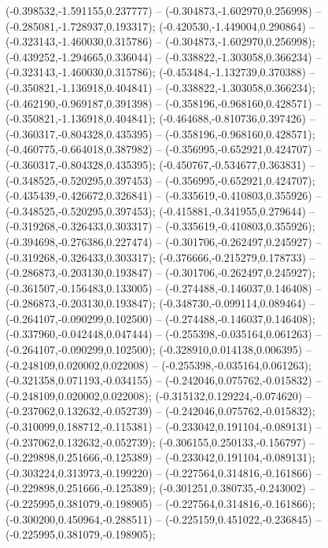 (-0.398532,-1.591155,0.237777) -- (-0.304873,-1.602970,0.256998) -- (-0.285081,-1.728937,0.193317);
 (-0.420530,-1.449004,0.290864) -- (-0.323143,-1.460030,0.315786) -- (-0.304873,-1.602970,0.256998);
 (-0.439252,-1.294665,0.336044) -- (-0.338822,-1.303058,0.366234) -- (-0.323143,-1.460030,0.315786);
 (-0.453484,-1.132739,0.370388) -- (-0.350821,-1.136918,0.404841) -- (-0.338822,-1.303058,0.366234);
 (-0.462190,-0.969187,0.391398) -- (-0.358196,-0.968160,0.428571) -- (-0.350821,-1.136918,0.404841);
 (-0.464688,-0.810736,0.397426) -- (-0.360317,-0.804328,0.435395) -- (-0.358196,-0.968160,0.428571);
 (-0.460775,-0.664018,0.387982) -- (-0.356995,-0.652921,0.424707) -- (-0.360317,-0.804328,0.435395);
 (-0.450767,-0.534677,0.363831) -- (-0.348525,-0.520295,0.397453) -- (-0.356995,-0.652921,0.424707);
 (-0.435439,-0.426672,0.326841) -- (-0.335619,-0.410803,0.355926) -- (-0.348525,-0.520295,0.397453);
 (-0.415881,-0.341955,0.279644) -- (-0.319268,-0.326433,0.303317) -- (-0.335619,-0.410803,0.355926);
 (-0.394698,-0.276386,0.227474) -- (-0.301706,-0.262497,0.245927) -- (-0.319268,-0.326433,0.303317);
 (-0.376666,-0.215279,0.178733) -- (-0.286873,-0.203130,0.193847) -- (-0.301706,-0.262497,0.245927);
 (-0.361507,-0.156483,0.133005) -- (-0.274488,-0.146037,0.146408) -- (-0.286873,-0.203130,0.193847);
 (-0.348730,-0.099114,0.089464) -- (-0.264107,-0.090299,0.102500) -- (-0.274488,-0.146037,0.146408);
 (-0.337960,-0.042448,0.047444) -- (-0.255398,-0.035164,0.061263) -- (-0.264107,-0.090299,0.102500);
 (-0.328910,0.014138,0.006395) -- (-0.248109,0.020002,0.022008) -- (-0.255398,-0.035164,0.061263);
 (-0.321358,0.071193,-0.034155) -- (-0.242046,0.075762,-0.015832) -- (-0.248109,0.020002,0.022008);
 (-0.315132,0.129224,-0.074620) -- (-0.237062,0.132632,-0.052739) -- (-0.242046,0.075762,-0.015832);
 (-0.310099,0.188712,-0.115381) -- (-0.233042,0.191104,-0.089131) -- (-0.237062,0.132632,-0.052739);
 (-0.306155,0.250133,-0.156797) -- (-0.229898,0.251666,-0.125389) -- (-0.233042,0.191104,-0.089131);
 (-0.303224,0.313973,-0.199220) -- (-0.227564,0.314816,-0.161866) -- (-0.229898,0.251666,-0.125389);
 (-0.301251,0.380735,-0.243002) -- (-0.225995,0.381079,-0.198905) -- (-0.227564,0.314816,-0.161866);
 (-0.300200,0.450964,-0.288511) -- (-0.225159,0.451022,-0.236845) -- (-0.225995,0.381079,-0.198905);
